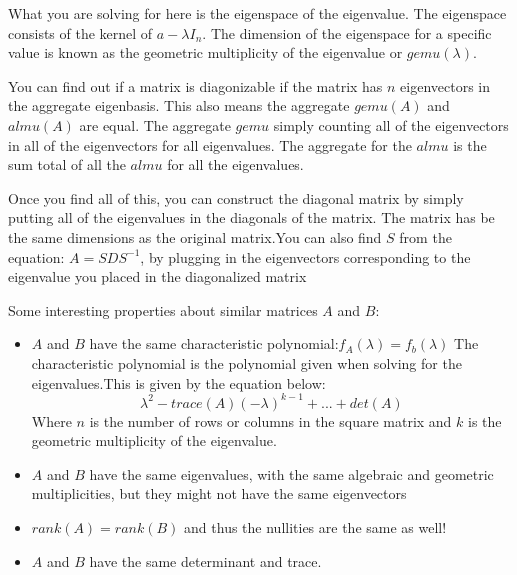 \documentclass[10pt,landscape]{article}
\begin{document}
\begin{multicols}{3}
What you are solving for here is the eigenspace of the eigenvalue. The eigenspace consists of the kernel of $a-\lambda I_n$. The dimension of the eigenspace for a specific value is known as the geometric multiplicity of the eigenvalue or $gemu(\lambda)$. 

You can find out if a matrix is diagonizable if the matrix has $n$ eigenvectors in the aggregate eigenbasis. This also means the aggregate $gemu(A)$ and $almu(A)$ are equal. The aggregate $gemu$ simply counting all of the eigenvectors in all of the eigenvectors for all eigenvalues. The aggregate for the $almu$ is the sum total of all the $almu$ for all the eigenvalues.

Once you find all of this, you can construct the diagonal matrix by simply putting all of the eigenvalues in the diagonals of the matrix. The matrix has be the same dimensions as the original matrix.You can also find $S$ from the equation: $A=SDS^{-1}$, by plugging in the eigenvectors corresponding to the eigenvalue you placed in the diagonalized matrix

Some interesting properties about similar matrices $A$ and $B$:
\begin{itemize}
    \item $A$ and $B$ have the same characteristic polynomial:$f_A(\lambda)=f_b(\lambda)$
    The characteristic polynomial is the polynomial given when solving for the eigenvalues.This is given by the equation below:
    \begin{equation*}
        \lambda^2-trace(A)(-\lambda)^{k-1}+...+det(A)
    \end{equation*}{}
    Where $n$ is the number of rows or columns in the square matrix and $k$ is the geometric multiplicity of the eigenvalue.
    \item  $A$ and $B$ have the same eigenvalues, with the same algebraic and geometric multiplicities, but they might not have the same eigenvectors
    \item $rank(A)=rank(B)$ and thus the nullities are the same as well!
    \item $A$ and $B$ have the same determinant and trace.
\end{itemize}{}






























\end{multicols}
\end{document}
